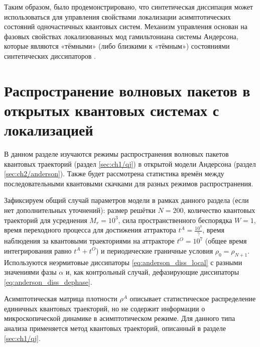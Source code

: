 Таким образом, было продемонстрировано, что синтетическая диссипация может использоваться для управления свойствами локализации асимптотических состояний одночастичных квантовых систем. Механизм управления основан на фазовых свойствах локализованных мод гамильтониана системы Андерсона, которые являются  «тёмными» (либо близкими к «тёмным») состояниями синтетических диссипаторов \cite{Vershinina2017}.

\section{Распространение волновых пакетов в открытых квантовых системах с локализацией}\label{sec:ch2/prb_jump}
В данном разделе изучаются режимы распространения волновых пакетов квантовых траекторий \cite{Dalibard1992, Dum1992, Plenio1998} (раздел \cref{sec:ch1/qj}) в открытой модели Андерсона (раздел \cref{sec:ch2/anderson}). Также будет рассмотрена статистика времён между последовательными квантовыми скачками для разных режимов распространения.

Зафиксируем общий случай параметров модели в рамках данного раздела (если нет дополнительных уточнений): размер решётки \(N=200\), количество квантовых траекторий для усреднения \(M_r=10^3\), сила пространственного беспорядка \(W=1\), время переходного процесса для достижения аттрактора \(t^A = \frac{10^3}{\gamma}\), время наблюдения за квантовыми траекториями на аттракторе \(t^O = 10^7\) (общее время интегрирования равно \(t^A + t^O\)) и периодические граничные условия \(\rho_0 = \rho_{N+1}\). Используются неэрмитовые диссипаторы \cref{eq:anderson_diss_local} с разными значениями фазы \(\alpha\) и, как контрольный случай, дефазирующие диссипаторы \cref{eq:anderson_diss_dephase}.

Асимптотическая матрица плотности \(\rho^A\) описывает статистическое распределение единичных квантовых траекторий, но не содержит информации о микроскопической динамике в асимптотическом режиме. Для данного типа анализа применяется метод квантовых траекторий, описанный в разделе \cref{sec:ch1/qj}.

